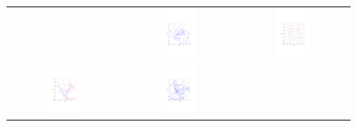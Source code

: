 \documentclass{article} %
\begin{document}
\begin{figure}[t!]
\begin{center}
\begin{tabular}{ccc}
&\includegraphics[trim={3.2cm 6cm 3cm 9cm},clip,width=0.33\textwidth]{../plots3/ReflectiveHMC_l25_eps0_1_log_scatter2D.pdf}
&\includegraphics[trim={3.2cm 6cm 3.2cm 9cm},clip,width=0.33\textwidth]{../plots3/energy_contour.pdf}  \\
  \includegraphics[trim={3.2cm 6cm 3.2cm 9cm},clip,width=0.33\textwidth]{../plots3/BaselineHMC_l25_eps0_2_log_scatter2D.pdf} 
&\includegraphics[trim={3.2cm 6cm 3.2cm 9cm},clip,width=0.33\textwidth]{../plots3/ReflectiveHMC_l25_eps0_2_log_scatter2D.pdf} 

\end{tabular}
\end{center}
\end{figure}
\end{document}
